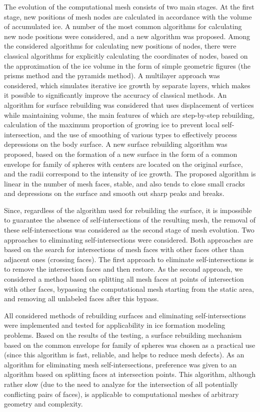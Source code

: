 \documentclass[
11pt,
tightenlines,
twoside,
onecolumn,
nofloats,
nobibnotes,
nofootinbib,
superscriptaddress,
noshowpacs,
centertags]
{revtex4-2}
\begin{document}
The evolution of the computational mesh consists of two main stages.
At the first stage, new positions of mesh nodes are calculated in accordance with the volume of accumulated ice.
A number of the most common algorithms for calculating new node positions were considered, and a new algorithm was proposed.
Among the considered algorithms for calculating new positions of nodes, there were classical algorithms for explicitly calculating the coordinates of nodes, based on the approximation of the ice volume in the form of simple geometric figures (the prisms method and the pyramids method).
A multilayer approach was considered, which simulates iterative ice growth by separate layers, which makes it possible to significantly improve the accuracy of classical methods.
An algorithm for surface rebuilding was considered that uses displacement of vertices while maintaining volume, the main features of which are step-by-step rebuilding, calculation of the maximum proportion of growing ice to prevent local self-intersection, and the use of smoothing of various types to effectively process depressions on the body surface.
A new surface rebuilding algorithm was proposed, based on the formation of a new surface in the form of a common envelope for family of spheres with centers are located on the original surface, and the radii correspond to the intensity of ice growth.
The proposed algorithm is linear in the number of mesh faces, stable, and also tends to close small cracks and depressions on the surface and smooth out sharp peaks and breaks.

Since, regardless of the algorithm used for rebuilding the surface, it is impossible to guarantee the absence of self-intersections of the resulting mesh, the removal of these self-intersections was considered as the second stage of mesh evolution.
Two approaches to eliminating self-intersections were considered.
Both approaches are based on the search for intersections of mesh faces with other faces other than adjacent ones (crossing faces).
The first approach to eliminate self-intersections is to remove the intersection faces and then restore.
As the second approach, we considered a method based on splitting all mesh faces at points of intersection with other faces, bypassing the computational mesh starting from the static area, and removing all unlabeled faces after this bypass.

All considered methods of rebuilding surfaces and eliminating self-intersections were implemented and tested for applicability in ice formation modeling problems.
Based on the results of the testing, a surface rebuilding mechanism based on the common envelope for family of spheres was chosen as a practical use (since this algorithm is fast, reliable, and helps to reduce mesh defects).
As an algorithm for eliminating mesh self-intersections, preference was given to an algorithm based on splitting faces at intersection points.
This algorithm, although rather slow (due to the need to analyze for the intersection of all potentially conflicting pairs of faces), is applicable to computational meshes of arbitrary geometry and complexity.
\end{document}
